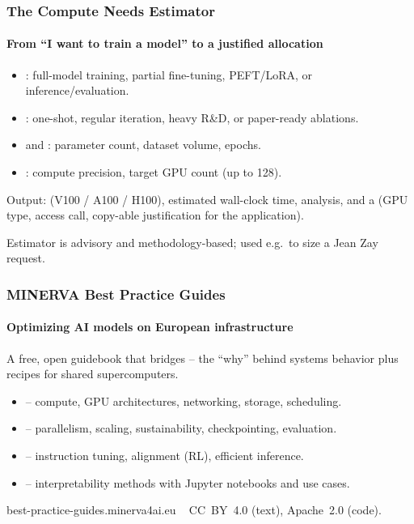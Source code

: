 \documentclass[10pt,aspectratio=169,notheorems]{beamer}
\begin{document}
\begin{frame}
    \frametitle{The Compute Needs Estimator}
    \framesubtitle{From ``I want to train a model'' to a justified allocation}
    \begin{itemize}
        \item {}: full-model training, partial fine-tuning, PEFT/LoRA, or inference/evaluation.
        \item {}: one-shot, regular iteration, heavy R\&D, or paper-ready ablations.
        \item {} and : parameter count, dataset volume, epochs.
        \item {}: compute precision, target GPU count (up to 128).
    \end{itemize}

    \vspace{0.6em}
    Output:  (V100 / A100 / H100),
    estimated wall-clock time,  analysis, and a
     (GPU type, access call, copy-able
    justification for the application).

    \vspace{1em}
    \textcolor{SlidemintMuted}{Estimator is advisory and methodology-based; used e.g.\ to size a Jean Zay request.}
\end{frame}

\begin{frame}
    \frametitle{MINERVA Best Practice Guides}
    \framesubtitle{Optimizing AI models on European infrastructure}
    A free, open guidebook that bridges  --
    the ``why'' behind systems behavior plus recipes for shared supercomputers.

    \vspace{0.8em}
    \begin{itemize}
        \item {} -- compute, GPU architectures, networking, storage, scheduling.
        \item {} -- parallelism, scaling, sustainability, checkpointing, evaluation.
        \item {} -- instruction tuning, alignment (RL), efficient inference.
        \item {} -- interpretability methods with Jupyter notebooks and use cases.
    \end{itemize}

    \vspace{0.8em}
    \textcolor{SlidemintMuted}{best-practice-guides.minerva4ai.eu\ \,\textbar\, CC~BY~4.0 (text), Apache~2.0 (code).}
\end{frame}
\end{document}
